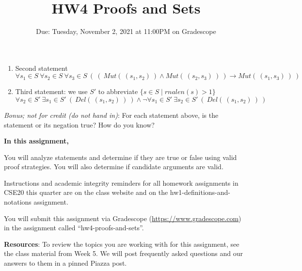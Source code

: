 \begin{enumerate}
\begin{enumerate}
 \item Second statement
 \[
 \forall s_1 \in S ~ \forall s_2 \in S ~\forall s_3 \in S ~\left( ~\left(~Mut(~(s_1,s_2)~) \land Mut(~(s_2, s_3)~) ~\right) \to Mut(~(s_1,s_3)~)~\right)
 \]
 
 \item Third statement: we use $S'$ to abbreviate $\{ s\in S \mid rnalen(s) > 1\}$
 \[
 \forall s_2 \in S' ~\exists s_1 \in S'~\left(~ Del(~(s_1,s_2)~)~\right) 
 \land \lnot \forall s_1 \in S' ~\exists s_2 \in S'~\left(~ Del(~(s_1,s_2)~)~\right) 
 \]
 \end{enumerate}

 {\it Bonus; not for credit (do not hand in)}:  For each statement above, is the statement or its negation true? How do you know?
 
 
\end{enumerate}
\newpage

\title{HW4 Proofs and Sets}
\date{Due: Tuesday, November 2, 2021 at 11:00PM on Gradescope}


\maketitle
\thispagestyle{fancy}

{\bf In this assignment,}

You will analyze statements and determine if they are true or false using valid proof strategies.
You will also determine if candidate arguments are valid.

Instructions and academic integrity reminders for all homework assignments in 
CSE20 this quarter are on the class website and on the hw1-definitions-and-notations
assignment.

You will submit this assignment via Gradescope
(\href{https://www.gradescope.com}{https://www.gradescope.com}) 
in the assignment called ``hw4-proofs-and-sets''.

{\bf Resources}: To review the topics you are working with 
for this assignment, see the class material from Week 5.
We will post frequently asked questions and our answers to them in a 
pinned Piazza post.


